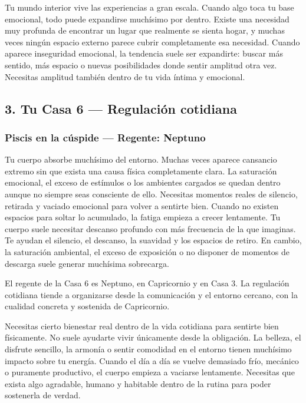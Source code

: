 \documentclass[11pt,a4paper]{article}
\begin{document}
Tu mundo interior vive las experiencias a gran escala. Cuando algo toca tu base emocional, todo puede expandirse muchísimo por dentro. Existe una necesidad muy profunda de encontrar un lugar que realmente se sienta hogar, y muchas veces ningún espacio externo parece cubrir completamente esa necesidad. Cuando aparece inseguridad emocional, la tendencia suele ser expandirte: buscar más sentido, más espacio o nuevas posibilidades donde sentir amplitud otra vez. Necesitas amplitud también dentro de tu vida íntima y emocional.

\vspace{0.8cm}

\subsection{3. Tu Casa 6 — Regulación cotidiana}

\subsubsection*{Piscis en la cúspide — Regente: Neptuno}

Tu cuerpo absorbe muchísimo del entorno. Muchas veces aparece cansancio extremo sin que exista una causa física completamente clara. La saturación emocional, el exceso de estímulos o los ambientes cargados se quedan dentro aunque no siempre seas consciente de ello. Necesitas momentos reales de silencio, retirada y vaciado emocional para volver a sentirte bien. Cuando no existen espacios para soltar lo acumulado, la fatiga empieza a crecer lentamente. Tu cuerpo suele necesitar descanso profundo con más frecuencia de la que imaginas. Te ayudan el silencio, el descanso, la suavidad y los espacios de retiro. En cambio, la saturación ambiental, el exceso de exposición o no disponer de momentos de descarga suele generar muchísima sobrecarga.

El regente de la Casa 6 es Neptuno, en Capricornio y en Casa 3. La regulación cotidiana tiende a organizarse desde la comunicación y el entorno cercano, con la cualidad concreta y sostenida de Capricornio.

Necesitas cierto bienestar real dentro de la vida cotidiana para sentirte bien físicamente. No suele ayudarte vivir únicamente desde la obligación. La belleza, el disfrute sencillo, la armonía o sentir comodidad en el entorno tienen muchísimo impacto sobre tu energía. Cuando el día a día se vuelve demasiado frío, mecánico o puramente productivo, el cuerpo empieza a vaciarse lentamente. Necesitas que exista algo agradable, humano y habitable dentro de la rutina para poder sostenerla de verdad.
\end{document}
